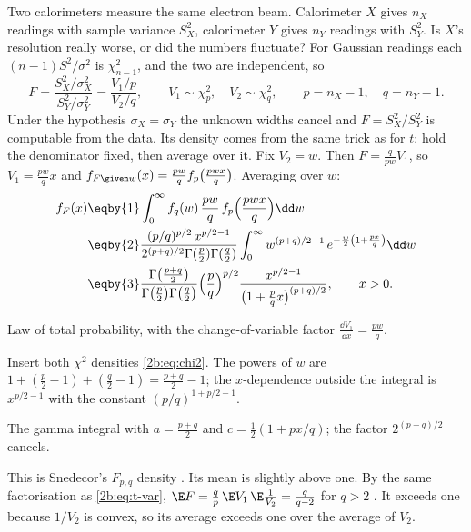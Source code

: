 Two calorimeters measure the same electron beam. Calorimeter $X$ gives $n_X$ readings with sample variance $S_X^2$, calorimeter $Y$ gives $n_Y$ readings with $S_Y^2$. Is $X$'s resolution really worse, or did the numbers fluctuate? For Gaussian readings each $(n-1)S^2/\sigma^2$ is $\chi^2_{n-1}$, and the two are independent, so 
\begin{equation}
  F=\frac{S_X^2/\sigma_X^2}{S_Y^2/\sigma_Y^2}=\frac{V_1/p}{V_2/q},\qquad V_1\sim\chi^2_p,\quad V_2\sim\chi^2_q,\qquad p=n_X-1,\quad q=n_Y-1 .
  \label{2b:eq:F-ratio}
\end{equation}
Under the hypothesis $\sigma_X=\sigma_Y$ the unknown widths cancel and $F=S_X^2/S_Y^2$ is computable from the data. Its density comes from the same trick as for $t$: hold the denominator fixed, then average over it. Fix $V_2=w$. Then $F=\frac{q}{pw}V_1$, so $V_1=\frac{pw}{q}x$ and $f_{F\given w}(x)=\frac{pw}{q}f_p\bigl(\frac{pwx}{q}\bigr)$. Averaging over $w$:
\begin{align}
  f_F(x)
  &\eqby{1} \int_0^\infty f_q(w)\,\frac{pw}{q}\,f_p\Bigl(\frac{pwx}{q}\Bigr)\dd w \nonumber\\
  &\eqby{2} \frac{(p/q)^{p/2}\,x^{p/2-1}}{2^{(p+q)/2}\Gamma(\frac p2)\Gamma(\frac q2)}\int_0^\infty w^{(p+q)/2-1}\,e^{-\frac w2\left(1+\frac{px}{q}\right)}\dd w \nonumber\\
  &\eqby{3} \frac{\Gamma\bigl(\frac{p+q}{2}\bigr)}{\Gamma\bigl(\frac p2\bigr)\Gamma\bigl(\frac q2\bigr)}\Bigl(\frac pq\Bigr)^{p/2}\frac{x^{p/2-1}}{\bigl(1+\frac pq x\bigr)^{(p+q)/2}},\qquad x>0 .
  \label{2b:eq:F}
\end{align}
\begin{explain}
  \item Law of total probability, with the change-of-variable factor $\frac{\dd V_1}{\dd x}=\frac{pw}{q}$.
  \item Insert both $\chi^2$ densities \eqref{2b:eq:chi2}. The powers of $w$ are $1+(\frac p2-1)+(\frac q2-1)=\frac{p+q}2-1$; the $x$-dependence outside the integral is $x^{p/2-1}$ with the constant $(p/q)^{1+p/2-1}$.
  \item The gamma integral with $a=\frac{p+q}{2}$ and $c=\frac12(1+px/q)$; the factor $2^{(p+q)/2}$ cancels.
\end{explain}
This is Snedecor's $F_{p,q}$ density . Its mean is slightly above one. By the same factorisation as \eqref{2b:eq:t-var}, $\E F=\frac qp\,\E V_1\,\E\frac1{V_2}=\frac{q}{q-2}$ for $q>2$ . It exceeds one because $1/V_2$ is convex, so its average exceeds one over the average of $V_2$.

